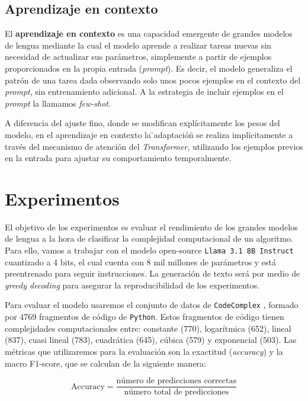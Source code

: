 \documentclass[12pt,twoside]{article}
\begin{document}
\subsection{Aprendizaje en contexto}
El \textbf{aprendizaje en contexto} \cite{in-context learning} es una capacidad emergente de grandes modelos de lengua mediante la cual el modelo aprende a realizar tareas nuevas sin necesidad de actualizar sus parámetros, simplemente a partir de ejemplos proporcionados en la propia entrada (\textit{prompt}). Es decir, el modelo generaliza el patrón de una tarea dada observando solo unos pocos ejemplos en el contexto del \textit{prompt}, sin entrenamiento adicional. A la estrategia de incluir ejemplos en el \textit{prompt} la llamamos \textit{few-shot}.

A diferencia del ajuste fino, donde se modifican explícitamente los pesos del modelo, en el aprendizaje en contexto la \"{}adaptación\"{} se realiza implícitamente a través del mecanismo de atención del \textit{Transformer}, utilizando los ejemplos previos en la entrada para ajustar su comportamiento temporalmente.

\section{Experimentos}

El objetivo de los experimentos es evaluar el rendimiento de los grandes modelos de lengua a la hora de clasificar la complejidad computacional de un algoritmo. Para ello, vamos a trabajar con el modelo open-source \texttt{Llama 3.1 8B Instruct} \cite{Llama} cuantizado a 4 bits, el cual cuenta con 8 mil millones de parámetros y está preentrenado para seguir instrucciones. La generación de texto será por medio de \textit{greedy decoding} para asegurar la reproducibilidad de los experimentos.

Para evaluar el modelo usaremos el conjunto de datos de \texttt{CodeComplex} \cite{CodeComplex}, formado por 4769 fragmentos de código de \texttt{Python}. Estos fragmentos de código tienen complejidades computacionales entre: constante (770), logarítmica (652), lineal (837), cuasi lineal (783), cuadrática (645), cúbica (579) y exponencial (503). Las métricas que utilizaremos para la evaluación son la exactitud (\textit{accuracy}) y la macro F1-score, que se calculan de la siguiente manera:

\begin{equation}
    \text{Accuracy}=\frac{\text{número de predicciones correctas}}{\text{número total de predicciones}}
\end{equation}
\end{document}
